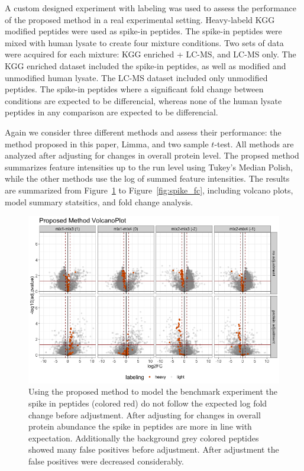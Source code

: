 \documentclass{mcp}
\def\sfigref#1{{Figure~\ref{#1}}}
\begin{document}
A custom designed experiment with labeling was used to assess the performance of the proposed method in a real experimental setting. Heavy-labeld KGG modified peptides were used as spike-in peptides. The spike-in peptides were mixed with human lysate to create four mixture conditions. Two sets of data were acquired for each mixture: KGG enriched + LC-MS, and LC-MS only. The KGG enriched dataset included the spike-in peptides, as well as modified and unmodified human lysate. The LC-MS dataset included only unmodified peptides. The spike-in peptides where a significant fold change between conditions are expected to be differencial, whereas none of the human lysate peptides in any comparison are expected to be differencial. 

Again we consider three different methods and assess their performance: the method proposed in this paper, Limma, and two sample $t$-test. All methods are analyzed after adjusting for changes in overall protein level. The propsed method summarizes feature intensities up to the run level using Tukey's Median Polish, while the other methods use the log of summed feature intensities. The results are summarized from \sfigref{fig:spike_volcano_msstats} to \sfigref{fig:spike_fc}, including volcano plots, model summary statsitics, and fold change analysis.

\begin{figure}[h!]
\centering
\includegraphics[width=.85\textwidth]{sim_new/spike_in_msstatsptm_volcano}
\caption{Using the proposed method to model the benchmark experiment the spike in peptides (colored red) do not follow the expected log fold change before adjustment. After adjusting for changes in overall protein abundance the spike in peptides are more in line with expectation. Additionally the background grey colored peptides showed many false positives before adjustment. After adjustment the false positives were decreased considerably. \label{fig:spike_volcano_msstats}}
\end{figure}
\end{document}
